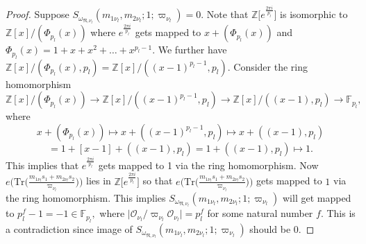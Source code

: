 \documentclass[reqno]{amsart}
\theoremstyle{plain}
\theoremstyle{definition}
\theoremstyle{remark}
\begin{document}
\begin{proof}
 Suppose $S_{\omega_{\mathfrak{N},\nu_l}} (m_{1\nu_l},m_{2\nu_l};1;\varpi_{\nu_l})= 0.$ 
Note that $\mathbb{Z}\Big[e^{\frac{2\pi i}{p_l}}\Big]$ is isomorphic to $\mathbb{Z}[x]/(\Phi_{p_l}(x))$ where  $e^{\frac{2\pi i}{p_l}}$ gets mapped to $x+(\Phi_{p_l}(x))$ and $\Phi_{p_l}(x)=1+x+x^2+\dots+x^{p_l-1}. $ We further have
$\mathbb{Z}[x]/(\Phi_{p_l}(x),p_l)=\mathbb{Z}[x]/((x-1)^{p_l-1},p_l)$. Consider the ring homomorphism  $$
\mathbb{Z}[x]/(\Phi_{p_l}(x))\rightarrow \mathbb{Z}[x]/((x-1)^{p_l-1},p_l) \rightarrow \mathbb{Z}[x]/((x-1),p_l)\rightarrow \mathbb{F}_{p_l},
$$
where $$x+(\Phi_{p_l}(x))\mapsto x+((x-1)^{p_l-1},p_l) \mapsto x+((x-1),p_l)$$ $$=1+[x-1]+((x-1),p_l)=1+((x-1),p_l)\mapsto 1.$$
This implies that $e^{\frac{2\pi i}{p_l}}$ gets mapped to 1 via the ring homomorphism.
Now  $e\Bigg(\mathrm{Tr}\Big( \frac{m_{1\nu_l} s_{1}+m_{2\nu_l} s_{2}}{\varpi_{\nu_l}}  \Big)\Bigg)$ lies in  $\mathbb{Z}\Big[e^{\frac{2\pi i}{p_l}}\Big]$ so that $e\Bigg(\mathrm{Tr}\Big( \frac{m_{1\nu_l} s_{1}+m_{2\nu_l} s_{2}}{\varpi_{\nu_l}}  \Big)\Bigg)$ gets mapped to $1$ via the ring homomorphism. This implies  $S_{\omega_{\mathfrak{N},\nu_l}} (m_{1\nu_l},m_{2\nu_l};1;\varpi_{\nu_l})$ will get mapped to $p_l^f-1=-1 \in \mathbb{F}_{p_l},$ where 
$\big|\mathcal{O}_{\nu_l} / \varpi_{\nu_l} \mathcal{O}_{\nu_l}\big|=p_l^f$ for some natural number $f.$ This is a contradiction since image of  $S_{\omega_{\mathfrak{N},\nu_l}} (m_{1\nu_l},m_{2\nu_l};1;\varpi_{\nu_l}) $ should be $0.$
\end{proof}
\end{document}
